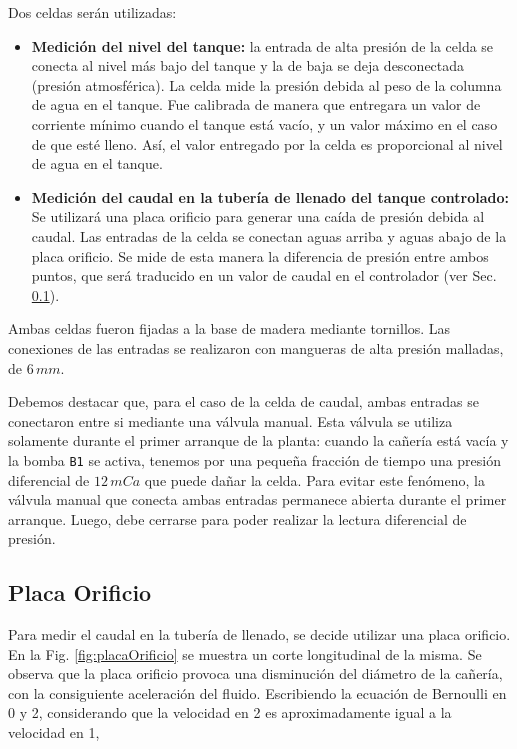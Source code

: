 Dos celdas serán utilizadas:
\begin{itemize}
 \item \textbf{Medición del nivel del tanque:} la entrada de alta presión de la
celda
se conecta  al nivel más bajo del tanque y la de baja se deja desconectada
(presión atmosférica).
La celda mide la presión debida al peso de la columna de agua en el tanque.
Fue calibrada de manera que entregara un valor de corriente mínimo
cuando el tanque está vacío, y un valor máximo en el caso de que esté
lleno.
Así, el valor entregado por la celda es proporcional al nivel de
agua en el tanque.

\item \textbf{Medición del caudal en la tubería de llenado del tanque
controlado:}
Se utilizará una placa orificio para generar una caída de presión debida al
caudal.
Las entradas de la celda se conectan aguas arriba y aguas abajo
de la placa orificio.
Se mide de esta manera la diferencia de presión entre ambos puntos, que será
traducido en un valor de caudal en el
controlador (ver Sec. \ref{subsec:PlacaOrificio}).
\end{itemize}

Ambas celdas fueron fijadas a la base de madera mediante tornillos.
Las conexiones de las entradas se realizaron con mangueras de alta presión
malladas, de $6\,mm$.

Debemos destacar que, para el caso de la celda de caudal, ambas
entradas se conectaron entre si mediante una válvula manual.
Esta válvula se utiliza solamente durante el primer arranque de la planta:
cuando la cañería está vacía y la bomba \verb|B1| se activa, tenemos por una
pequeña
fracción de tiempo una presión diferencial de $12\,mCa$ que puede dañar la
celda.
Para evitar este fenómeno, la válvula manual que conecta ambas entradas
permanece abierta durante el primer arranque.
Luego, debe cerrarse para poder realizar la lectura diferencial de presión.

\subsection{Placa Orificio}
\label{subsec:PlacaOrificio}

Para medir el caudal en la tubería de llenado, se decide
utilizar una placa orificio.
En la Fig. \ref{fig:placaOrificio} se muestra un
corte longitudinal de la misma.
Se observa que la placa orificio provoca una disminución del diámetro
de la cañería, con la consiguiente aceleración del fluido.
Escribiendo la ecuación de Bernoulli en 0 y 2, considerando que la velocidad en
2 es aproximadamente igual a la velocidad en 1,

